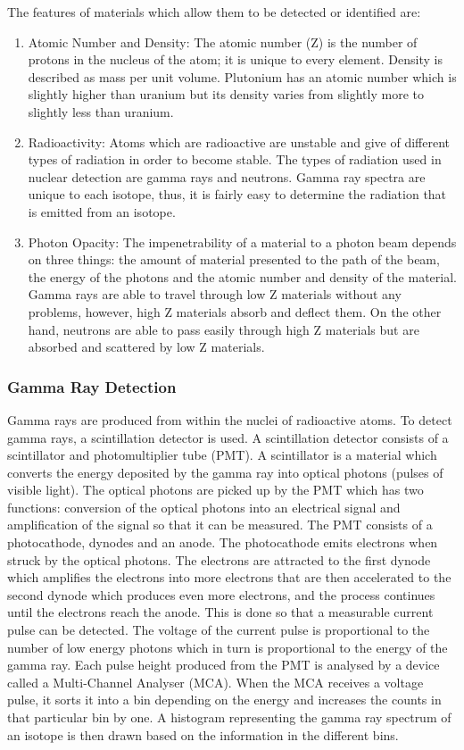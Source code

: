 \documentclass[twoside,titlepage,11pt,twocolumn,a4paper]{article}
\begin{document}
The features of materials which allow them to be detected or
identified are:
\begin{enumerate}
\item Atomic Number and Density: The atomic number (Z) is the number
  of protons in the nucleus of the atom; it is unique to every
  element. Density is described as mass per unit volume. Plutonium has
  an atomic number which is slightly higher than uranium but its
  density varies from slightly more to slightly less than uranium.
  \citep{medalia2007}
\item Radioactivity: Atoms which are radioactive are unstable and give
  of different types of radiation in order to become stable. The types
  of radiation used in nuclear detection are gamma rays and
  neutrons. Gamma ray spectra are unique to each
  isotope, thus, it is fairly easy to determine the radiation that is
  emitted from an isotope. \citep{medalia2007} 
\item Photon Opacity: The impenetrability of a material to a photon
  beam depends on three things: the amount of material presented to
  the path of the beam, the energy of the photons and the atomic
  number and density of the material. Gamma rays are able to travel
  through low Z materials without any problems, however, high Z
  materials absorb and deflect them. On the other hand, neutrons are
  able to pass easily through high Z materials but are absorbed and
  scattered by low Z materials. \citep{medalia2007}
\end{enumerate}

\subsubsection{Gamma Ray Detection}
Gamma rays are produced from within the nuclei of radioactive
atoms. \citep{bushberg1994} To detect gamma rays, a scintillation
detector is used. A scintillation detector consists of a scintillator
and photomultiplier tube (PMT). A scintillator is a material which
converts the energy deposited by the gamma ray into optical photons
(pulses of visible light). The optical photons are picked up by the
PMT which has two functions: conversion of the optical photons into an
electrical signal and amplification of the signal so that it can be
measured. The PMT consists of a photocathode, dynodes and an
anode. The photocathode emits electrons when struck by the optical
photons.  The electrons are attracted to the first dynode which
amplifies the electrons into more electrons that are then accelerated
to the second dynode which produces even more electrons, and the
process continues until the electrons reach the anode. This is done so
that a measurable current pulse can be detected. The voltage of the
current pulse is proportional to the number of low energy photons
which in turn is proportional to the energy of the gamma ray. Each
pulse height produced from the PMT is analysed by a device called a
Multi-Channel Analyser (MCA). When the MCA receives a voltage pulse,
it sorts it into a bin depending on the energy and increases the
counts in that particular bin by one. A histogram representing the
gamma ray spectrum of an isotope is then drawn based on the
information in the different bins. \citep{medalia2007,bushberg1994}
\end{document}
